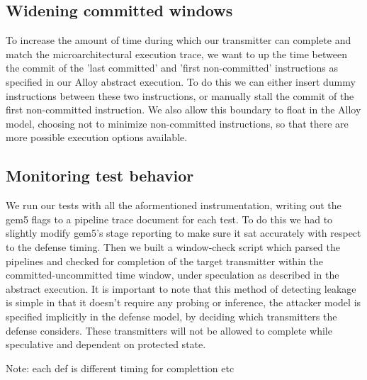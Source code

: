 \subsection{Widening committed windows}
To increase the amount of time during which our transmitter can complete and match the microarchitectural execution trace, we want to up the time between the commit of the 'last committed' and 'first non-committed' instructions as specified in our Alloy abstract execution. To do this we can either insert dummy instructions between these two instructions, or manually stall the commit of the first non-committed instruction. We also allow this boundary to float in the Alloy model, choosing not to minimize non-committed instructions, so that there are more possible execution options available. 

\subsection{Monitoring test behavior}
We run our tests with all the aformentioned instrumentation, writing out the gem5 flags to a pipeline trace document for each test. To do this we had to slightly modify gem5's stage reporting to make sure it sat accurately with respect to the defense timing. Then we built a window-check script which parsed the pipelines and checked for completion of the target transmitter within the committed-uncommitted time window, under speculation as described in the abstract execution. It is important to note that this method of detecting leakage is simple in that it doesn't require any probing or inference, the attacker model is specified implicitly in the defense model, by deciding which transmitters the defense considers. These transmitters will not be allowed to complete while speculative and dependent on protected state. 


Note: each def is different timing for complettion etc



